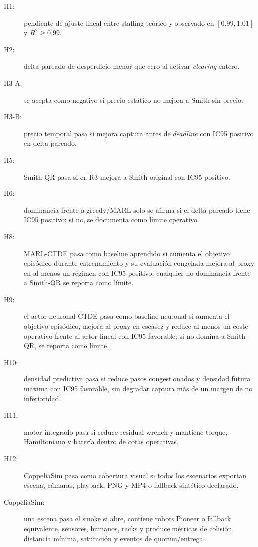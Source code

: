 \begin{description}
  \item[H1:] pendiente de ajuste lineal entre staffing teórico y observado en
  $[0.99,1.01]$ y $R^2\geq0.99$.
  \item[H2:] delta pareado de desperdicio menor que cero al activar
  \emph{clearing} entero.
  \item[H3-A:] se acepta como negativo si precio estático no mejora a Smith sin precio.
  \item[H3-B:] precio temporal pasa si mejora captura antes de \emph{deadline} con
  IC95 positivo en delta pareado.
  \item[H5:] Smith-QR pasa si en R3 mejora a Smith original con IC95 positivo.
  \item[H6:] dominancia frente a greedy/MARL solo se afirma si el delta pareado tiene
  IC95 positivo; si no, se documenta como límite operativo.
  \item[H8:] MARL-CTDE pasa como baseline aprendido si aumenta el objetivo episódico
  durante entrenamiento y su evaluación congelada mejora al proxy en al menos un régimen
  con IC95 positivo; cualquier no-dominancia frente a Smith-QR se reporta como límite.
  \item[H9:] el actor neuronal CTDE pasa como baseline neuronal si aumenta el objetivo
  episódico, mejora al proxy en escasez y reduce al menos un coste operativo frente al
  actor lineal con IC95 favorable; si no domina a Smith-QR, se reporta como límite.
  \item[H10:] densidad predictiva pasa si reduce pasos congestionados y densidad futura
  máxima con IC95 favorable, sin degradar captura más de un margen de no inferioridad.
  \item[H11:] motor integrado pasa si reduce residual wrench y mantiene torque,
  Hamiltoniano y batería dentro de cotas operativas.
  \item[H12:] CoppeliaSim pasa como cobertura visual si todos los escenarios exportan
  escena, cámaras, playback, PNG y MP4 o fallback sintético declarado.
  \item[CoppeliaSim:] una escena pasa el smoke si abre, contiene robots Pioneer o
  fallback equivalente, sensores, humanos, racks y produce métricas de colisión,
  distancia mínima, saturación y eventos de quorum/entrega.
\end{description}
